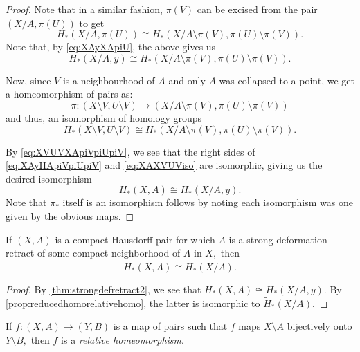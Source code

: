 \documentclass[12pt]{article}
\begin{document}
\begin{proof}
	Note that in a similar fashion, $\pi(V)$ can be excised from the pair $(X/A, \pi(U))$ to get
	\begin{equation*} 
		H_*(X/A, \pi(U)) \cong H_*(X/A\setminus\pi(V), \pi(U)\setminus\pi(V)).
	\end{equation*}
	Note that, by \cref{eq:XAyXApiU}, the above gives us
	\begin{equation} \label{eq:XAyHApiVpiUpiV}
		H_*(X/A, y) \cong H_*(X/A\setminus\pi(V), \pi(U)\setminus\pi(V)).
	\end{equation}

	Now, since $V$ is a neighbourhood of $A$ and only $A$ was collapsed to a point, we get a homeomorphism of pairs as:
	\begin{equation*} 
		\pi:(X \setminus V, U \setminus V) \to (X/A \setminus \pi(V), \pi(U)\setminus\pi(V))
	\end{equation*}
	and thus, an isomorphism of homology groups
	\begin{equation} \label{eq:XVUVXApiVpiUpiV}
		H_*(X \setminus V, U \setminus V) \cong H_*(X/A \setminus \pi(V), \pi(U)\setminus\pi(V)).
	\end{equation}

	By \cref{eq:XVUVXApiVpiUpiV}, we see that the right sides of \cref{eq:XAyHApiVpiUpiV} and \cref{eq:XAXVUViso} are isomorphic, giving us the desired isomorphism
	\begin{equation*} 
		H_*(X, A) \cong H_*(X/A, y).
	\end{equation*}
	Note that $\pi_*$ itself is an isomorphism follows by noting each isomorphism was one given by the obvious maps.
\end{proof}

\begin{cor} \label{cor:reducedhomoquotient}
	If $(X, A)$ is a compact Hausdorff pair for which $A$ is a strong deformation retract of some compact neighborhood of $A$ in $X,$ then
	\begin{equation*} 
		H_*(X, A) \cong \widetilde{H}_*(X/A).
	\end{equation*}
\end{cor}
\begin{proof} 
	By \cref{thm:strongdefretract2}, we see that $H_*(X, A) \cong H_*(X/A, y).$ By \cref{prop:reducedhomorelativehomo}, the latter is isomorphic to $\widetilde{H}_*(X/A).$
\end{proof}

\begin{defn}
	If $f: (X, A) \to (Y, B)$ is a map of pairs such that $f$ maps $X\setminus A$ bijectively onto $Y \setminus B,$ then $f$ is a \emph{relative homeomorphism}.
\end{defn}
\end{document}
